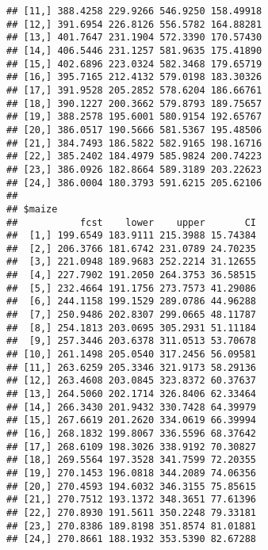 \documentclass[
]{article}
\begin{document}
\begin{verbatim}
## [11,] 388.4258 229.9266 546.9250 158.49918
## [12,] 391.6954 226.8126 556.5782 164.88281
## [13,] 401.7647 231.1904 572.3390 170.57430
## [14,] 406.5446 231.1257 581.9635 175.41890
## [15,] 402.6896 223.0324 582.3468 179.65719
## [16,] 395.7165 212.4132 579.0198 183.30326
## [17,] 391.9528 205.2852 578.6204 186.66761
## [18,] 390.1227 200.3662 579.8793 189.75657
## [19,] 388.2578 195.6001 580.9154 192.65767
## [20,] 386.0517 190.5666 581.5367 195.48506
## [21,] 384.7493 186.5822 582.9165 198.16716
## [22,] 385.2402 184.4979 585.9824 200.74223
## [23,] 386.0926 182.8664 589.3189 203.22623
## [24,] 386.0004 180.3793 591.6215 205.62106
## 
## $maize
##           fcst    lower    upper       CI
##  [1,] 199.6549 183.9111 215.3988 15.74384
##  [2,] 206.3766 181.6742 231.0789 24.70235
##  [3,] 221.0948 189.9683 252.2214 31.12655
##  [4,] 227.7902 191.2050 264.3753 36.58515
##  [5,] 232.4664 191.1756 273.7573 41.29086
##  [6,] 244.1158 199.1529 289.0786 44.96288
##  [7,] 250.9486 202.8307 299.0665 48.11787
##  [8,] 254.1813 203.0695 305.2931 51.11184
##  [9,] 257.3446 203.6378 311.0513 53.70678
## [10,] 261.1498 205.0540 317.2456 56.09581
## [11,] 263.6259 205.3346 321.9173 58.29136
## [12,] 263.4608 203.0845 323.8372 60.37637
## [13,] 264.5060 202.1714 326.8406 62.33464
## [14,] 266.3430 201.9432 330.7428 64.39979
## [15,] 267.6619 201.2620 334.0619 66.39994
## [16,] 268.1832 199.8067 336.5596 68.37642
## [17,] 268.6109 198.3026 338.9192 70.30827
## [18,] 269.5564 197.3528 341.7599 72.20355
## [19,] 270.1453 196.0818 344.2089 74.06356
## [20,] 270.4593 194.6032 346.3155 75.85615
## [21,] 270.7512 193.1372 348.3651 77.61396
## [22,] 270.8930 191.5611 350.2248 79.33181
## [23,] 270.8386 189.8198 351.8574 81.01881
## [24,] 270.8661 188.1932 353.5390 82.67288
\end{verbatim}
\end{document}
